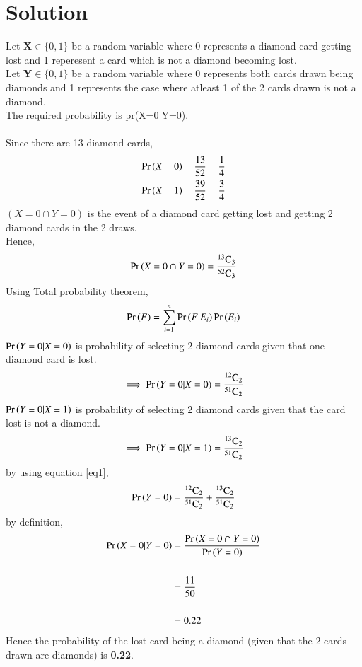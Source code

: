 \documentclass[journal,12pt,twocolumn]{IEEEtran}
\begin{document}
\section{Solution}
Let $\textbf{X} \in \{0,1\}$ be a random variable where 0 represents a diamond card getting lost and 1 reperesent  a card which is not a diamond becoming lost. \\
Let $\textbf{Y} \in \{0,1\} $ be a random variable where 0 represents both cards drawn being diamonds and 1 represents the case where atleast 1 of the 2 cards drawn is not a diamond.\\
The required probability is pr(X=0$|$Y=0).\\
\\Since there are 13 diamond cards,
\begin{align}
    \Pr\left(X=0\right)=\frac{13}{52}=\frac{1}{4}\\
    \Pr\left(X=1\right)=\frac{39}{52}=\frac{3}{4}
\end{align}
$(X=0 \cap Y=0)$ is the event of a diamond card getting lost and getting 2 diamond cards in the 2 draws.\\
Hence,
\begin{align}
    \Pr\left(X=0 \cap Y=0\right)=\frac{{}^{13}\mathrm{C}_{3}}{{}^{52}\mathrm{C}_{3}}
\end{align}
Using Total probability theorem,
\begin{align}
    \Pr\left(F\right)=\sum_{i=1}^{n}\Pr\left(F \vert E_{i}\right)\Pr\left(E_{i}\right) \label{eq1}
\end{align}
$\Pr\left(Y=0|X=0\right)$ is probability of selecting 2 diamond cards given that one diamond card is lost.
\begin{align}
   \implies \Pr\left(Y=0 \vert X=0\right)=\frac{{}^{12}\mathrm{C}_{2}}{{}^{51}\mathrm{C}_{2}}
\end{align}
$\Pr\left(Y=0|X=1\right)$ is probability of selecting 2 diamond cards given that the card lost is not a diamond.
\begin{align}
    \implies \Pr\left(Y=0 \vert X=1\right)=\frac{{}^{13}\mathrm{C}_{2}}{{}^{51}\mathrm{C}_{2}}
\end{align}
by using equation \eqref{eq1},
\begin{align}
\begin{split}
    \Pr\left(Y=0\right)=\frac{{}^{12}\mathrm{C}_{2}}{{}^{51}\mathrm{C}_{2}}+\frac{{}^{13}\mathrm{C}_{2}}{{}^{51}\mathrm{C}_{2}}
\end{split}
\end{align}
by definition,
\begin{align}
\begin{split}
    \Pr\left(X=0 \vert Y=0\right)&=\frac{\Pr\left(X=0 \cap Y=0\right)}{\Pr\left(Y=0\right)}\\\\
                     &=\frac{11}{50}\\\\
                     &=0.22
\end{split}
\end{align}
Hence the probability of the lost card being a diamond (given that the 2 cards drawn are diamonds) is \textbf{0.22}.
\end{document}
